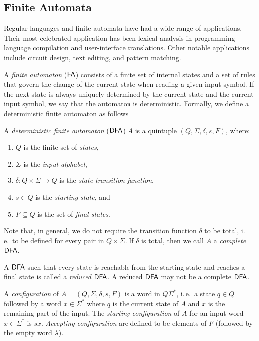 \subsection{Finite Automata}
\label{subsection:finite-automata}

Regular languages and finite automata have had a wide range of applications. Their most celebrated application has been lexical analysis in programming language compilation and user-interface translations. Other notable applications include circuit design, text editing, and pattern matching.

A \emph{finite automaton} \index{$\FA$}($\FA$) consists of a finite set of internal states and a set of rules that govern the change of the current state when reading a given input symbol. If the next state is always uniquely determined by the current state and the current input symbol, we say that the automaton is deterministic. Formally, we define a deterministic finite automaton as follows:

A \emph{deterministic finite automaton} \index{$\DFA$}($\DFA$) $A$ is a quintuple $(Q, \Sigma, \delta, s, F)$, where:

\begin{enumerate}[]
\item $Q$ is the finite set of \emph{states},
\item $\Sigma$ is the \emph{input alphabet},
\item $\delta: Q \times \Sigma \to Q$ is the \emph{state transition function},
\item $s \in Q$ is the \emph{starting state}, and
\item $F \subseteq Q$ is the set of \emph{final states}.
\end{enumerate}

Note that, in general, we do not require the transition function $\delta$ to be total, i.\,e.\ to be defined for every pair in $Q \times \Sigma$. If $\delta$ is total, then we call $A$ a \emph{complete} $\DFA$.

A \index{$\DFA$}$\DFA$ such that every state is reachable from the starting state and reaches a final state is called a \emph{reduced} $\DFA$. A reduced $\DFA$ may not be a complete $\DFA$.

A \emph{configuration} of $A = (Q, \Sigma, \delta, s, F)$ is a word in $Q \Sigma^*$, i.\,e.\ a state $q \in Q$ followed by a word $x \in \Sigma^*$ where $q$ is the current state of $A$ and $x$ is the remaining part of the input. The \emph{starting configuration} of $A$ for an input word $x \in \Sigma^*$ is $sx$.  \emph{Accepting configuration} are defined to be elements of $F$ (followed by the empty word $\lambda$).

